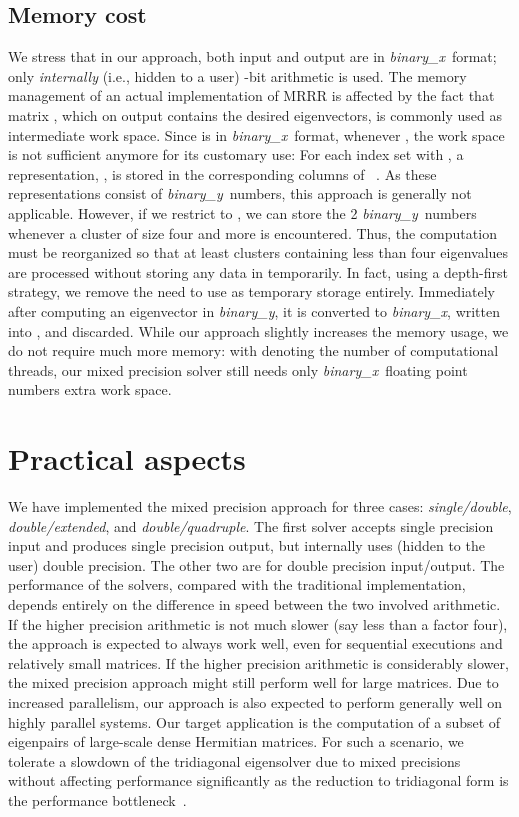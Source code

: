 \documentclass[final]{siamltex}
\newcommand{\binaryx}{{\it binary\_\hspace*{1pt}x}}
\newcommand{\binaryy}{{\it binary\_\hspace*{0pt}y}}
\begin{document}
\subsection{Memory cost}
\label{sec:memcost}

We stress that in our approach, both input and output are in \binaryx\
format; only {\it internally} (i.e., hidden to a user) -bit
arithmetic is used.
The memory management of an actual implementation of MRRR is affected by the
fact that matrix , which on output contains
the desired eigenvectors, 
is commonly used as intermediate work space. Since  is in \binaryx\ format, whenever , the work space is not sufficient anymore for its customary use: For
each index set  with , a
representation, , is stored in the corresponding columns of
~\cite{DesignMRRR,mr3smp}. 
As these representations consist of  \binaryy\ numbers, this approach
is generally not applicable. However, if we restrict to , we can store the 2 
\binaryy\ numbers whenever a cluster of size four and more is encountered. Thus, the computation
must be reorganized so that at least clusters containing less than four
eigenvalues are processed without storing any data in  temporarily. In
fact, using a depth-first strategy, we remove the need to use  as
temporary storage entirely. 
Immediately after computing an eigenvector
in \binaryy, it is converted to \binaryx, written into , and
discarded. While our approach slightly increases the memory usage, we
do not require much more memory: with  denoting the number of computational
threads, our mixed precision solver still needs only 
\binaryx\ floating point numbers extra work space.  


\section{Practical aspects}
\label{sec:implementation}

We have implemented the mixed precision approach for three cases:
{\it single/double}, {\it double/extended}, and {\it double/quadruple}. The
first solver accepts single precision input and produces single precision
output, but internally uses (hidden to the user) double precision. The
other two are for double precision input/output. The performance of the
solvers, compared with the traditional implementation, depends entirely on
the difference in speed between the two involved arithmetic. 
If the higher precision arithmetic is not much slower (say less
than a factor four), the approach is expected to always work well, even for
sequential executions and relatively small matrices. If the higher
precision arithmetic is considerably slower, the mixed precision approach
might still perform well for large 
matrices. Due to increased parallelism, our approach is also
expected to perform generally well on highly parallel systems. 
Our target application is the computation of a subset of eigenpairs of
large-scale dense Hermitian matrices. For such a scenario, we 
tolerate a slowdown of the tridiagonal eigensolver due to mixed precisions
without affecting performance significantly as the reduction to tridiagonal
form is the performance bottleneck~\cite{EleMRRR,mixedtr}.
\end{document}
